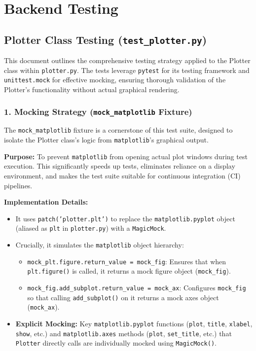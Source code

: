 \documentclass[12pt]{article}
\begin{document}
\section{Backend Testing}

\subsection{Plotter Class Testing (\texttt{test\_plotter.py})}

This document outlines the comprehensive testing strategy applied to the Plotter class within \texttt{plotter.py}. The tests leverage \texttt{pytest} for its testing framework and \texttt{unittest.mock} for effective mocking, ensuring thorough validation of the Plotter's functionality without actual graphical rendering.

\subsubsection*{1. Mocking Strategy (\texttt{mock\_matplotlib} Fixture)}
The \texttt{mock\_matplotlib} fixture is a cornerstone of this test suite, designed to isolate the Plotter class's logic from \texttt{matplotlib}'s graphical output.

\textbf{Purpose:} To prevent \texttt{matplotlib} from opening actual plot windows during test execution. This significantly speeds up tests, eliminates reliance on a display environment, and makes the test suite suitable for continuous integration (CI) pipelines.

\textbf{Implementation Details:}
\begin{itemize}
  \item It uses \texttt{patch('plotter.plt')} to replace the \texttt{matplotlib.pyplot} object (aliased as \texttt{plt} in \texttt{plotter.py}) with a \texttt{MagicMock}.
  \item Crucially, it simulates the \texttt{matplotlib} object hierarchy:
  \begin{itemize}
    \item \texttt{mock\_plt.figure.return\_value = mock\_fig}: Ensures that when \texttt{plt.figure()} is called, it returns a mock figure object (\texttt{mock\_fig}).
    \item \texttt{mock\_fig.add\_subplot.return\_value = mock\_ax}: Configures \texttt{mock\_fig} so that calling \texttt{add\_subplot()} on it returns a mock axes object (\texttt{mock\_ax}).
  \end{itemize}
  \item \textbf{Explicit Mocking:} Key \texttt{matplotlib.pyplot} functions (\texttt{plot}, \texttt{title}, \texttt{xlabel}, \texttt{show}, etc.) and \texttt{matplotlib.axes} methods (\texttt{plot}, \texttt{set\_title}, etc.) that \texttt{Plotter} directly calls are individually mocked using \texttt{MagicMock()}.
\end{itemize}
\end{document}
